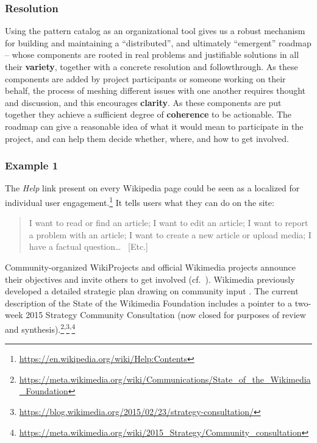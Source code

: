 \subsubsection*{Resolution}
Using the pattern catalog as an
organizational tool gives us a robust mechanism for
building and maintaining a ``distributed'', and ultimately
``emergent'' roadmap -- whose components are rooted in real problems
and justifiable solutions in all their \textbf{variety}, together with a concrete resolution and
followthrough.  As these components are added by project participants or someone working on 
their behalf, the process of meshing different issues with one another requires thought and
discussion, and this encourages \textbf{clarity}.  As these components are put together
they achieve a sufficient degree of \textbf{coherence} to be actionable.
%
The roadmap can give  a reasonable idea of what it would mean to participate in the project, and can help them  decide whether, where, and how to get involved.

\subsubsection*{Example 1}  The \emph{Help} link present on every Wikipedia page could be seen as a
localized  for individual user
engagement.\footnote{\url{https://en.wikipedia.org/wiki/Help:Contents}}
It tells users what they can do on the site:

\begin{quotation}
\noindent 
I want to read or find an article;
I want to edit an article;
I want to report a problem with an article;
I want to create a new article or upload media;
I have a factual question\ldots
~[Etc.]
\end{quotation}

Community-organized WikiProjects and official Wikimedia projects announce their objectives  and invite others to get involved (cf.~).  Wikimedia previously developed
a detailed strategic plan drawing on community input
\cite{wikimedia2011plan}.  The current description of the State of
the Wikimedia Foundation includes a pointer to a two-week 2015
Strategy Community Consultation (now closed for purposes of
review and synthesis).\footnote{\url{https://meta.wikimedia.org/wiki/Communications/State_of_the_Wikimedia_Foundation}}\textsuperscript{,}\footnote{\url{https://blog.wikimedia.org/2015/02/23/strategy-consultation/}}\textsuperscript{,}\footnote{\url{https://meta.wikimedia.org/wiki/2015_Strategy/Community_consultation}}


